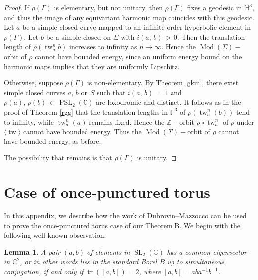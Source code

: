 \documentclass[reqno]{amsart}
\theoremstyle{plain}
\newtheorem{lemma}[theorem]{Lemma}
\theoremstyle{definition}
\theoremstyle{remark}
\newcommand{\C}{{\mathbb{C}}}
\newcommand{\Z}{{\mathbb{Z}}}
\DeclareMathOperator{\Mod}{Mod}
\DeclareMathOperator{\PSL}{PSL}
\DeclareMathOperator{\SL}{SL}
\DeclareMathOperator{\tw}{tw}
\DeclareMathOperator{\tr}{tr}
\newcommand\HHH{{\mathbb H}}
\begin{document}
\begin{proof} 
If $\rho(\Gamma)$ is elementary, but not unitary, then $\rho(\Gamma)$ fixes a geodesic in $\HHH^3$, and thus 
the image of any equivariant harmonic map coincides with this geodesic. Let $a$ be a simple closed curve mapped 
to an infinite order hyperbolic element in $\rho(\Gamma)$. Let $b$ be a simple closed on $\Sigma$ with $i(a,\,b) 
\,>\, 0$. Then the translation length of $\rho(\tw_a^n b)$ increases to infinity as $n \to \infty$. Hence the 
$\Mod(\Sigma)-$orbit of $\rho$ cannot have bounded energy, since an uniform energy bound on the harmonic maps 
implies that they are uniformly Lipschitz.
	
Otherwise, suppose $\rho(\Gamma)$ is non-elementary. By Theorem \ref{gkm}, there exist simple closed curves $a, 
\,b$ on $S$ such that $i(a,\,b) \,=\, 1$ and $\rho(a),\, \rho(b) \,\in\, \PSL_2(\C)$ are loxodromic and 
distinct. It follows as in the proof of Theorem \ref{rgg} that the translation lengths in $\HHH^3$ of 
$\rho(\tw_a^n (b))$ tend to infinity, while $\tw_a^n (a)$ remains fixed. Hence the $\Z-$orbit $\rho 
\circ\tw_a^n$ of $\rho$ under $\langle \tw \rangle$ cannot have bounded energy. Thus the $\Mod(\Sigma)-$orbit 
of $\rho$ cannot have bounded energy, as before.
	
The possibility that remains is that $\rho(\Gamma)$ is unitary. 
\end{proof}

\appendix

\section{Case of once-punctured torus} \label{appendix-a}
In this appendix, we describe how the work of Dubrovin--Mazzocco \cite{dm} can be used to prove the once-punctured torus case of our Theorem B. We begin with the following well-known observation.

\begin{lemma}
\label{tracelem}
A pair $(a,b)$ of elements in $\SL_2(\C)$ has a common eigenvector in $\C^2$, or in other words lies in the standard Borel $B$ up to simultaneous conjugation, if and only if $\tr([a,b])=2$, where $[a,b]=aba^{-1}b^{-1}$.
\end{lemma}
\end{document}
